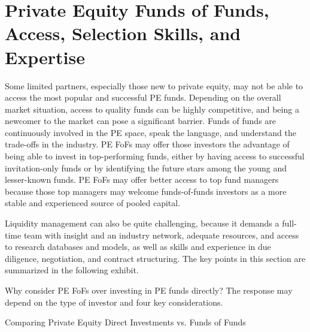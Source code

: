 \documentclass[11pt]{article}
\begin{document}
\section*{Private Equity Funds of Funds, Access, Selection Skills, and Expertise}
Some limited partners, especially those new to private equity, may not be able to access the most popular and successful PE funds. Depending on the overall market situation, access to quality funds can be highly competitive, and being a newcomer to the market can pose a significant barrier. Funds of funds are continuously involved in the PE space, speak the language, and understand the trade-offs in the industry. PE FoFs may offer those investors the advantage of being able to invest in top-performing funds, either by having access to successful invitation-only funds or by identifying the future stars among the young and lesser-known funds. PE FoFs may offer better access to top fund managers because those top managers may welcome funds-of-funds investors as a more stable and experienced source of pooled capital.

Liquidity management can also be quite challenging, because it demands a full-time team with insight and an industry network, adequate resources, and access to research databases and models, as well as skills and experience in due diligence, negotiation, and contract structuring. The key points in this section are summarized in the following exhibit.

Why consider PE FoFs over investing in PE funds directly? The response may depend on the type of investor and four key considerations.

Comparing Private Equity Direct Investments vs. Funds of Funds
\end{document}
